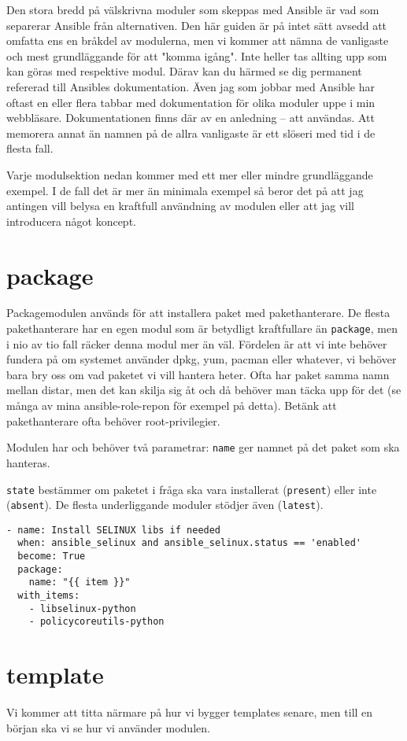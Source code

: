 Den stora bredd på välskrivna moduler som skeppas med Ansible är vad som separerar Ansible från alternativen.
Den här guiden är på intet sätt avsedd att omfatta ens en bråkdel av modulerna, men vi kommer att nämna de
vanligaste och mest grundläggande för att "komma igång". Inte heller tas allting upp som kan göras med respektive
modul. Därav kan du härmed se dig permanent refererad till Ansibles dokumentation. Även jag som jobbar med
Ansible har oftast en eller flera tabbar med dokumentation för olika moduler uppe i min webbläsare. 
Dokumentationen finns där av en anledning -- att användas. Att memorera annat än namnen på de allra vanligaste är
ett slöseri med tid i de flesta fall.

Varje modulsektion nedan kommer med ett mer eller mindre grundläggande exempel. I de fall det är mer än minimala
exempel så beror det på att jag antingen vill belysa en kraftfull användning av modulen eller att jag vill introducera något koncept.

\section{package}
Packagemodulen används för att installera paket med pakethanterare. De flesta pakethanterare har en egen modul som
är betydligt kraftfullare än \texttt{package}, men i nio av tio fall räcker denna modul mer än väl. Fördelen är att
vi inte behöver fundera på om systemet använder dpkg, yum, pacman eller whatever, vi behöver bara bry oss om vad 
paketet vi vill hantera heter. Ofta har paket samma namn mellan distar, men det kan skilja sig åt och då behöver
man täcka upp för det (se många av mina ansible-role-repon för exempel på detta). Betänk att pakethanterare ofta
behöver root-privilegier.

Modulen har och behöver två parametrar:
\texttt{name} ger namnet på det paket som ska hanteras.

\texttt{state} bestämmer om paketet i fråga ska vara installerat (\texttt{present}) eller inte (\texttt{absent}). De
flesta underliggande moduler stödjer även (\texttt{latest}).

\begin{verbatim}
- name: Install SELINUX libs if needed
  when: ansible_selinux and ansible_selinux.status == 'enabled'
  become: True
  package:
    name: "{{ item }}"
  with_items:
    - libselinux-python
    - policycoreutils-python
\end{verbatim}


\section{template}
Vi kommer att titta närmare på hur vi bygger templates senare, men till en början ska vi se hur vi använder modulen.


